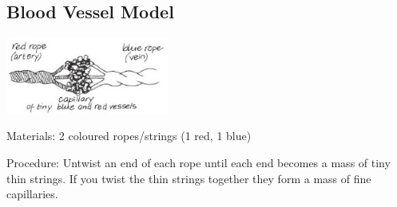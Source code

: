 \begin{multicols}{2}
%
%

\subsection{Blood Vessel Model} %

\begin{center}
\includegraphics[width=0.4\textwidth]{./img/vso/blood-vessels.jpg}
\end{center}

\begin{description*}
\item[Materials:]{2 coloured ropes/strings (1 red, 1 blue)}
\item[Procedure:]{Untwist an end of each
rope until each end becomes a
mass of tiny thin strings. If you
twist the thin strings together
they form a mass of fine
capillaries.}
\end{description*}


\end{multicols}

